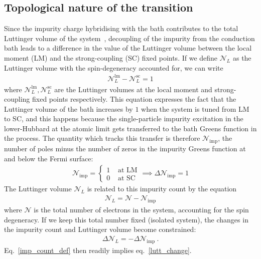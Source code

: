 \documentclass[reprint,hidelinks]{revtex4-2}
\begin{document}
\begin{widetext}
\section{Topological nature of the transition}
Since the impurity charge hybridising with the bath contributes to the total Luttinger volume of the system~\cite{martin1982fermi}, decoupling of the impurity from the conduction bath leads to a difference in the value of the Luttinger volume between the local moment (LM) and the strong-coupling (SC) fixed points. If we define \(\mathcal{N}_L\) as the Luttinger volume with the spin-degeneracy accounted for, we can write
\begin{equation}\begin{aligned}
	\label{lutt_change}
	\mathcal{N}_L^\text{lm} - \mathcal{N}_L^\text{sc} = 1
\end{aligned}\end{equation}
where \(\mathcal{N}_L^\text{lm},\mathcal{N}_L^\text{sc}\) are the Luttinger volumes at the local moment and strong-coupling fixed points respectively. This equation expresses the fact that the Luttinger volume of the bath increases by \(1\) when the system is tuned from LM to SC, and this happens because the single-particle impurity excitation in the lower-Hubbard at the atomic limit gets transferred to the bath Greens function in the process. The quantity which tracks this transfer is therefore \(\mathcal{N}_\text{imp}\), the number of poles minus the number of zeros in the impurity Greens function at and below the Fermi surface:
\begin{equation}\begin{aligned}
	\label{imp_count_def}
	\mathcal{N}_\text{imp} = \begin{cases}
		1 & \text{ at LM}\\
		0 & \text{ at SC}
	\end{cases}\implies \Delta \mathcal{N}_\text{imp} = 1
\end{aligned}\end{equation}
The Luttinger volume \(\mathcal{N}_L\) is related to this impurity count by the equation
\begin{equation}\begin{aligned}
	\mathcal{N}_L = \mathcal{N} - \mathcal{N}_\text{imp}
\end{aligned}\end{equation}
where \(\mathcal{N}\) is the total number of electrons in the system, accounting for the spin degeneracy. If we keep this total number fixed (isolated system), the changes in the impurity count and Luttinger volume become constrained: 
\begin{equation}\begin{aligned}
	\Delta \mathcal{N}_L = - \Delta \mathcal{N}_\text{imp}~.
\end{aligned}\end{equation}
Eq.~\ref{imp_count_def} then readily implies eq.~\ref{lutt_change}.


\end{widetext}
\end{document}
